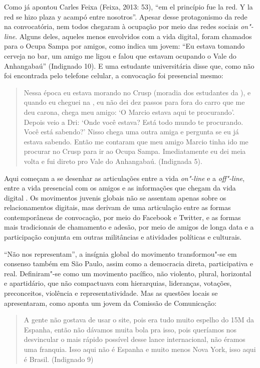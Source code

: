 Como já apontou Carles Feixa (Feixa, 2013: 53), ``em el princípio fue la
red. Y la red se hizo plaza y acampó entre nosotros''. Apesar desse
protagonismo da rede na convocatória, nem todos chegaram à ocupação por
meio das redes sociais \emph{on"-line}. Alguns deles, aqueles menos
envolvidos com a vida digital, foram chamados para o Ocupa Sampa por
amigos, como indica um jovem: ``Eu estava tomando cerveja no bar, um
amigo me ligou e falou que estavam ocupando o Vale do Anhangabaú''
(Indignado 10). E uma estudante universitária disse que, como não foi
encontrada pelo telefone celular, a convocação foi presencial mesmo:

\begin{quote}
Nessa época eu estava morando no Crusp (moradia dos estudantes da ),
e quando eu cheguei na , eu não dei dez passos para fora do carro que
me deu carona, chega meu amigo: `O Marcio estava aqui te procurando'.
Depois veio a Dri: `Onde você estava? Está todo mundo te procurando.
Você está sabendo?' Nisso chega uma outra amiga e pergunta se eu já
estava sabendo. Então me contaram que meu amigo Marcio tinha ido me
procurar no Crusp para ir ao Ocupa Sampa. Imediatamente eu dei meia
volta e fui direto pro Vale do Anhangabaú. (Indignada 5).
\end{quote}

Aqui começam a se desenhar as articulações entre a vida \emph{on"-line} e
a \emph{off"-line}, entre a vida presencial com os amigos e as
informações que chegam da vida digital . Os movimentos juvenis globais
não se assentam apenas sobre os relacionamentos digitais, mas derivam de
uma articulação entre as formas contemporâneas de convocação, por meio
do Facebook e Twitter, e as formas mais tradicionais de chamamento e
adesão, por meio de amigos de longa data e a participação conjunta em
outras militâncias e atividades políticas e culturais.

``Não nos representam'', a insígnia global do movimento transformou"-se
em consenso também em São Paulo, assim como a democracia direta,
participativa e real. Definiram"-se como um movimento pacífico, não
violento, plural, horizontal e apartidário, que não compactuava com
hierarquias, lideranças, votações, preconceitos, violência e
representatividade. Mas as questões locais se apresentaram, como aponta
um jovem da Comissão de Comunicação:

\begin{quote}
A gente não gostava de usar o site, pois era tudo muito espelho do 15M
da Espanha, então não dávamos muita bola pra isso, pois queríamos nos
desvincular o mais rápido possível desse lance internacional, não éramos
uma franquia. Isso aqui não é Espanha e muito menos Nova York, isso aqui
é Brasil. (Indignado 9)
\end{quote}

